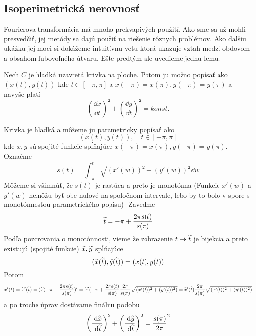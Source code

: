 \subsection{Isoperimetrická nerovnosť}

Fourierova transformácia má mnoho prekvapivých použití. Ako sme sa už
mohli presvedčiť, jej metódy sa dajú použiť na riešenie rôznych
problémov. Ako ďalšiu ukážku jej moci si dokážeme intuitívnu vetu
ktorá ukazuje vzťah medzi obdovom a obsahom ľubovoľného útvaru.
Ešte predtým ale uvedieme jednu lemu:
\begin{lema}
  Nech $C$ je hladká uzavretá krivka na ploche. Potom ju možno popísať
  ako $(x(t),y(t))$ kde $t\in[-\pi,\pi]$ a $x(-\pi)=x(\pi),
  y(-\pi)=y(\pi)$ a navyše platí
  \begin{equation}
    \left(\frac{\dd x}{\dd t}\right)^2 +
    \left(\frac{\dd y}{\dd t}\right)^2 = konst.
  \end{equation}    
  \label{lema:ekvidist_parametric}
\end{lema}
\begin{dokaz}
    Krivka je hladká a môžeme ju parametricky popísať ako
    \begin{equation}
        \left(x(t),y(t)\right), \quad t\in[-\pi,\pi]
    \end{equation}
    kde $x,y$ sú spojité funkcie spĺňajúce $x(-\pi)=x(\pi), y(-\pi)=y(\pi)$.
  Označme
   \begin{equation}
        s(t) = \int_{-\pi}^t \sqrt{ (x'(w))^2 + (y'(w))^2} \dd w
   \end{equation}
   Môžeme si všimnúť, že $s(t)$ je rastúca a preto je monotónna
   (Funkcie $x'(w)$ a $y'(w)$ nemôžu byť obe nulové na spoločnom intervale,
   lebo by to bolo v spore s monotónnosťou parametrického popisu)-
   Zaveďme
    \begin{equation}
        \widetilde{t} = -\pi + \frac{2 \pi s(t)}{s(\pi)}
    \end{equation}
   Podľa pozorovania o monotónnosti, vieme že zobrazenie
   $t\rightarrow \widetilde{t}$ je bijekcia a preto existujú (spojité funkcie)
   $\widetilde{x},\widetilde{y}$ spĺňajúce
   \begin{equation}
        (\widetilde{x}(\widetilde{t}),\widetilde{y}(\widetilde{t})) = (x(t),y(t))
   \end{equation}
   Potom
   \begin{equation}
        x'(t) = \widetilde{x}'(\widetilde{t}) =
        (\widetilde{x}(-\pi + \frac{2 \pi s(t)}{s(\pi)})' =
        \widetilde{x}'(-\pi + \frac{2 \pi s(t)}{s(\pi)} 
        \frac{2\pi}{s(\pi)}
        \sqrt{ (x'(t))^2 + (y'(t))^2)} =
        \widetilde{x}'(\widetilde{t}) \frac{2\pi}{s(\pi)}
        \sqrt{ (x'(t))^2 + (y'(t))^2)}
   \end{equation}
   a po troche úprav dostávame finálnu podobu   
   \begin{equation}
    \left(\frac{\; \mathrm{d} \widetilde{x}}{\; \mathrm{d} \widetilde{t}}\right)^2 +
    \left(\frac{\; \mathrm{d} \widetilde{y}}{\; \mathrm{d} \widetilde{t}}\right)^2 = 
    \frac{s(\pi)}{2\pi}^2
    \label{eq:ekvidist_parametric}
   \end{equation}
\end{dokaz}

